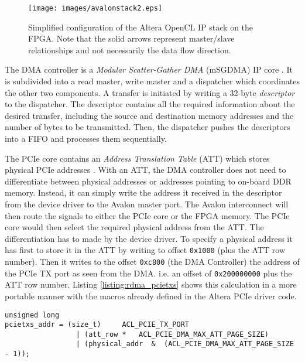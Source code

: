 \begin{figure}[htb]
	  \centerline{
		\texttt{[image: images/avalonstack2.eps]}}
	  \caption{Simplified configuration of the Altera  OpenCL IP stack on the FPGA.
	           Note that the solid arrows represent master/slave relationships and not necessarily the data flow direction.}
	  \label{fig:avalonstack}
\end{figure}


The DMA controller is a \emph{Modular Scatter-Gather DMA} (mSGDMA) IP core \cite{altera_msgdma}.
It is subdivided into a read master, write master and a dispatcher which coordinates the other two components.
A transfer is initiated by writing a 32-byte \emph{descriptor} to the dispatcher.
The descriptor contains all the required information about the desired transfer, including the source and destination memory addresses and the number of bytes to be transmitted.
Then, the dispatcher pushes the descriptors into a FIFO and processes them sequentially.




The PCIe core contains an \emph{Address Translation Table} (ATT) which stores physical PCIe addresses \cite{altera_pcie_core}.
With an ATT, the DMA controller does not need to differentiate between physical addresses or addresses pointing to on-board DDR memory.
Instead, it can simply write the address it received in the descriptor from the device driver to the Avalon master port.
The Avalon interconnect will then route the signals to either the PCIe core or the FPGA memory.
The PCIe core would then select the required physical address from the ATT.
The differentiation has to made by the device driver.
To specify a physical address it has first to store it in the ATT by writing to offset \texttt{0x1000} (plus the ATT row number).
Then it writes to the offset \texttt{0xc800} (the DMA Controller) the address of the PCIe TX port as seen from the DMA. i.e. an offset of \texttt{0x200000000} plus the ATT row number.
Listing \ref{listing:rdma_pcietxs} shows this calculation in a more portable manner with the macros already defined in the Altera PCIe driver code.



\begin{lstlisting}[label=listing:rdma_pcietxs, caption=Calculation of the PCIe address as seen from the DMA controller]
unsigned long
pcietxs_addr = (size_t)     ACL_PCIE_TX_PORT 
                 | (att_row *   ACL_PCIE_DMA_MAX_ATT_PAGE_SIZE) 
                 | (physical_addr  &  (ACL_PCIE_DMA_MAX_ATT_PAGE_SIZE - 1));
\end{lstlisting}


